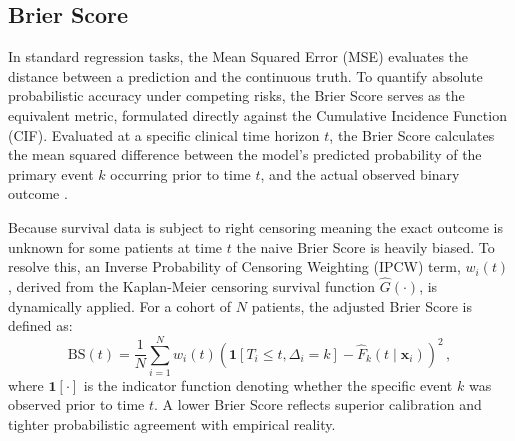 \documentclass[a4paper,twoside,12pt]{report}
\begin{document}
\subsection{Brier Score}
In standard regression tasks, the Mean Squared Error (MSE) evaluates the distance between a prediction and the continuous truth. To quantify absolute probabilistic accuracy under competing risks, the Brier Score serves as the equivalent metric, formulated directly against the Cumulative Incidence Function (CIF). Evaluated at a specific clinical time horizon $t$, the Brier Score calculates the mean squared difference between the model's predicted probability of the primary event $k$ occurring prior to time $t$, and the actual observed binary outcome \citep{Graf1999}.

Because survival data is subject to right censoring meaning the exact outcome is unknown for some patients at time $t$ the naive Brier Score is heavily biased. To resolve this, an Inverse Probability of Censoring Weighting (IPCW) term, $w_i(t)$, derived from the Kaplan-Meier censoring survival function $\hat{G}(\cdot)$, is dynamically applied. For a cohort of $N$ patients, the adjusted Brier Score is defined as:
$$
\text{BS}(t) = \frac{1}{N} \sum_{i=1}^N w_i(t) \left( \mathbf{1}[T_i \le t, \Delta_i = k] - \hat{F}_k(t \mid \mathbf{x}_i) \right)^2 \,,
$$
where $\mathbf{1}[\cdot]$ is the indicator function denoting whether the specific event $k$ was observed prior to time $t$. A lower Brier Score reflects superior calibration and tighter probabilistic agreement with empirical reality.

\end{document}
